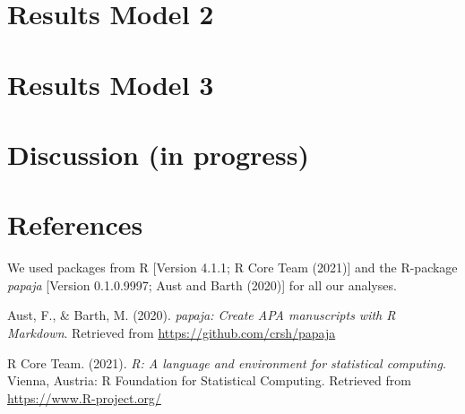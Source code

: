 \documentclass[
  english,
  man]{apa6}
\newlength{\cslhangindent}
\newlength{\cslentryspacingunit} %
\newenvironment{CSLReferences}[2] %
 {%
  \setlength{\parindent}{0pt}
  \ifodd #1
  \let\oldpar\par
  \def\par{\hangindent=\cslhangindent\oldpar}
  \fi
  \setlength{\parskip}{#2\cslentryspacingunit}
 }%
 {}
\begin{document}
\hypertarget{results-model-2}{%
\section{Results Model 2}\label{results-model-2}}

\hypertarget{results-model-3}{%
\section{Results Model 3}\label{results-model-3}}

\hypertarget{discussion-in-progress}{%
\section{Discussion (in progress)}\label{discussion-in-progress}}

\newpage

\hypertarget{references}{%
\section{References}\label{references}}

We used packages from R {[}Version 4.1.1; R Core Team (2021){]} and the R-package \emph{papaja} {[}Version 0.1.0.9997; Aust and Barth (2020){]} for all our analyses.

\begingroup
\setlength{\parindent}{-0.5in}
\setlength{\leftskip}{0.5in}

\hypertarget{refs}{}
\begin{CSLReferences}{1}{0}
\leavevmode{}%
Aust, F., \& Barth, M. (2020). \emph{{papaja}: {Create} {APA} manuscripts with {R Markdown}}. Retrieved from \url{https://github.com/crsh/papaja}

\leavevmode{}%
R Core Team. (2021). \emph{R: A language and environment for statistical computing}. Vienna, Austria: R Foundation for Statistical Computing. Retrieved from \url{https://www.R-project.org/}

\end{CSLReferences}

\endgroup
\end{document}
